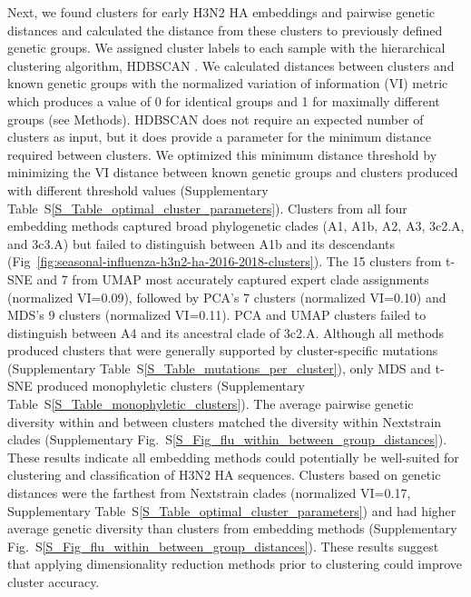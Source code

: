 \documentclass[webpdf,contemporary,large,single]{oup-authoring-template}%
\theoremstyle{thmstyleone}%
\theoremstyle{thmstyletwo}%
\theoremstyle{thmstylethree}%
\begin{document}
Next, we found clusters for early H3N2 HA embeddings and pairwise genetic distances and calculated the distance from these clusters to previously defined genetic groups.
We assigned cluster labels to each sample with the hierarchical clustering algorithm, HDBSCAN \citep{campello2015hierarchical}.
We calculated distances between clusters and known genetic groups with the normalized variation of information (VI) metric \citep{meilua2003comparing} which produces a value of 0 for identical groups and 1 for maximally different groups (see Methods).
HDBSCAN does not require an expected number of clusters as input, but it does provide a parameter for the minimum distance required between clusters.
We optimized this minimum distance threshold by minimizing the VI distance between known genetic groups and clusters produced with different threshold values (Supplementary Table~S\ref{S_Table_optimal_cluster_parameters}).
Clusters from all four embedding methods captured broad phylogenetic clades (A1, A1b, A2, A3, 3c2.A, and 3c3.A) but failed to distinguish between A1b and its descendants (Fig~\ref{fig:seasonal-influenza-h3n2-ha-2016-2018-clusters}).
The 15 clusters from t-SNE and 7 from UMAP most accurately captured expert clade assignments (normalized VI=0.09), followed by PCA's 7 clusters (normalized VI=0.10) and MDS's 9 clusters (normalized VI=0.11).
PCA and UMAP clusters failed to distinguish between A4 and its ancestral clade of 3c2.A.
Although all methods produced clusters that were generally supported by cluster-specific mutations (Supplementary Table~S\ref{S_Table_mutations_per_cluster}), only MDS and t-SNE produced monophyletic clusters (Supplementary Table~S\ref{S_Table_monophyletic_clusters}).
The average pairwise genetic diversity within and between clusters matched the diversity within Nextstrain clades (Supplementary Fig.~S\ref{S_Fig_flu_within_between_group_distances}).
These results indicate all embedding methods could potentially be well-suited for clustering and classification of H3N2 HA sequences.
Clusters based on genetic distances were the farthest from Nextstrain clades (normalized VI=0.17, Supplementary Table~S\ref{S_Table_optimal_cluster_parameters}) and had higher average genetic diversity than clusters from embedding methods (Supplementary Fig.~S\ref{S_Fig_flu_within_between_group_distances}).
These results suggest that applying dimensionality reduction methods prior to clustering could improve cluster accuracy.
\end{document}
